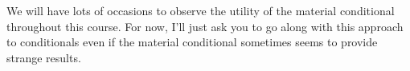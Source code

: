 We will have lots of occasions to observe the utility of the material conditional throughout this course.
For now, I'll just ask you to go along with this approach to conditionals even if the material conditional sometimes seems to provide strange results.



%
%
%


%
%
%

